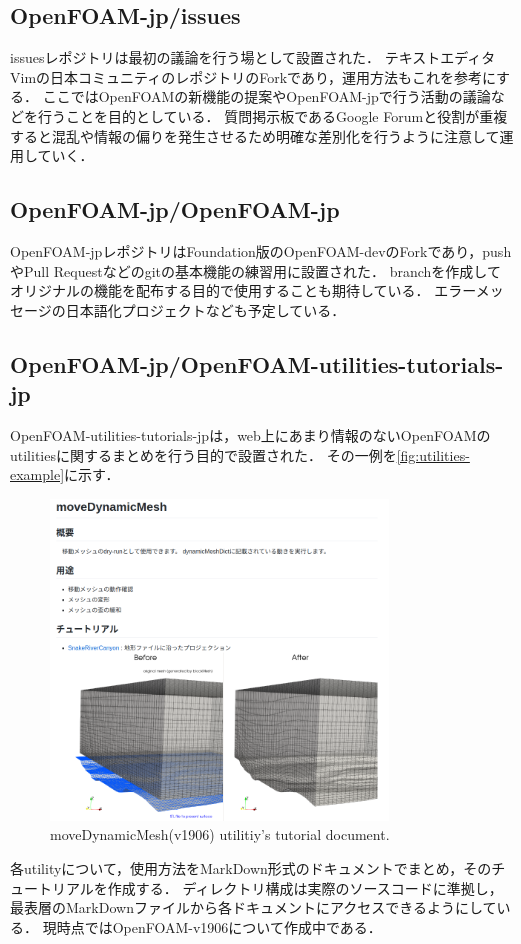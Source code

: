 \documentclass{ltjoc}
\begin{document}
\subsection{OpenFOAM-jp/issues}
issuesレポジトリ\cite{URL:OpenFOAM-jp-issues}は最初の議論を行う場として設置された．
テキストエディタVimの日本コミュニティのレポジトリ\cite{URL:vim-jp}のForkであり，運用方法もこれを参考にする．
ここではOpenFOAMの新機能の提案やOpenFOAM-jpで行う活動の議論などを行うことを目的としている．
質問掲示板であるGoogle Forumと役割が重複すると混乱や情報の偏りを発生させるため明確な差別化を行うように注意して運用していく．
%
\subsection{OpenFOAM-jp/OpenFOAM-jp}
OpenFOAM-jpレポジトリ\cite{URL:OpenFOAM-jp-OpenFOAM-jp}はFoundation版のOpenFOAM-devのForkであり，pushやPull Requestなどのgitの基本機能の練習用に設置された．
branchを作成してオリジナルの機能を配布する目的で使用することも期待している．
エラーメッセージの日本語化プロジェクトなども予定している．
%
\subsection{OpenFOAM-jp/OpenFOAM-utilities-tutorials-jp}
OpenFOAM-utilities-tutorials-jp\cite{URL:OpenFOAM-jp-OpenFOAM-utilities-tutorials-jp}は，web上にあまり情報のないOpenFOAMのutilitiesに関するまとめを行う目的で設置された．
その一例を\autoref{fig:utilities-example}に示す．
\begin{figure}[htbp]
\centering
\includegraphics[width=0.8\textwidth]{fig/utilities-example.png}
\caption{moveDynamicMesh(v1906) utilitiy's tutorial document.\cite{URL:OpenFOAM-jp-movedDynamicMesh}}
\label{fig:utilities-example}
\end{figure}
各utilityについて，使用方法をMarkDown形式のドキュメントでまとめ，そのチュートリアルを作成する．
ディレクトリ構成は実際のソースコードに準拠し，最表層のMarkDownファイルから各ドキュメントにアクセスできるようにしている．\cite{URL:OpenFOAM-jp-util-index}
現時点ではOpenFOAM-v1906について作成中である．
%
\end{document}
